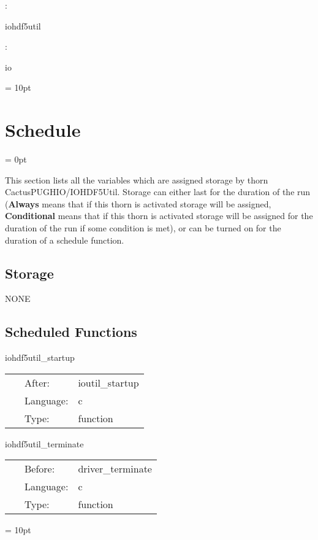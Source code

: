 \documentclass{article}
\begin{document}
: 

iohdf5util
\vspace{2mm}

: 

io
\vspace{2mm}

\vspace{5mm}\parskip = 10pt 

\section{Schedule} 


\parskip = 0pt


\noindent This section lists all the variables which are assigned storage by thorn CactusPUGHIO/IOHDF5Util.  Storage can either last for the duration of the run ({\bf Always} means that if this thorn is activated storage will be assigned, {\bf Conditional} means that if this thorn is activated storage will be assigned for the duration of the run if some condition is met), or can be turned on for the duration of a schedule function.


\subsection*{Storage}NONE
\subsection*{Scheduled Functions}
\vspace{5mm}


\hspace{5mm} iohdf5util\_startup 

\hspace{5mm}{\it iohdf5util startup routine } 


\hspace{5mm}

 \begin{tabular*}{160mm}{cll} 
~ & After:  & ioutil\_startup \\ 
~ & Language:  & c \\ 
~ & Type:  & function \\ 
\end{tabular*} 


\vspace{5mm}


\hspace{5mm} iohdf5util\_terminate 

\hspace{5mm}{\it iohdf5util termination routine } 


\hspace{5mm}

 \begin{tabular*}{160mm}{cll} 
~ & Before:  & driver\_terminate \\ 
~ & Language:  & c \\ 
~ & Type:  & function \\ 
\end{tabular*} 



\vspace{5mm}\parskip = 10pt 
\end{document}

